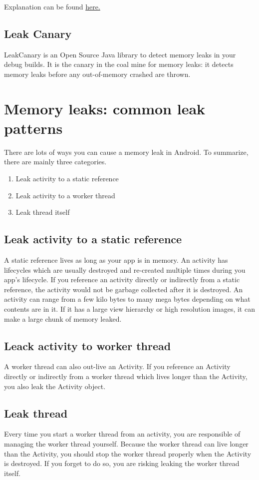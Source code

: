 Explanation can be found \href{https://developer.android.com/studio/profile/memory-profiler.html}{here.}

\subsection{Leak Canary}
LeakCanary is an Open Source Java library to detect memory leaks in your debug builds. It is the canary in the coal mine for memory leaks: it detects memory leaks before any out-of-memory crashed are thrown. 

\section{Memory leaks: common leak patterns}
There are lots of ways you can cause a memory leak in Android. To summarize, there are mainly three categories.

\begin{enumerate}
	\item Leak activity to a static reference
	\item Leak activity to a worker thread
	\item Leak thread itself
\end{enumerate}

\subsection{Leak activity to a static reference}
A static reference lives as long as your app is in memory. An activity has lifecycles which are usually destroyed and re-created multiple times during you app’s lifecycle. If you reference an activity directly or indirectly from a static reference, the activity would not be garbage collected after it is destroyed. An activity can range from a few kilo bytes to many mega bytes depending on what contents are in it. If it has a large view hierarchy or high resolution images, it can make a large chunk of memory leaked.

\subsection{Leack activity to worker thread}
A worker thread can also out-live an Activity. If you reference an Activity directly or indirectly from a worker thread which lives longer than the Activity, you also leak the Activity object.

\subsection{Leak thread}
Every time you start a worker thread from an activity, you are responsible of managing the worker thread yourself. Because the worker thread can live longer than the Activity, you should stop the worker thread properly when the Activity is destroyed. If you forget to do so, you are risking leaking the worker thread itself.

